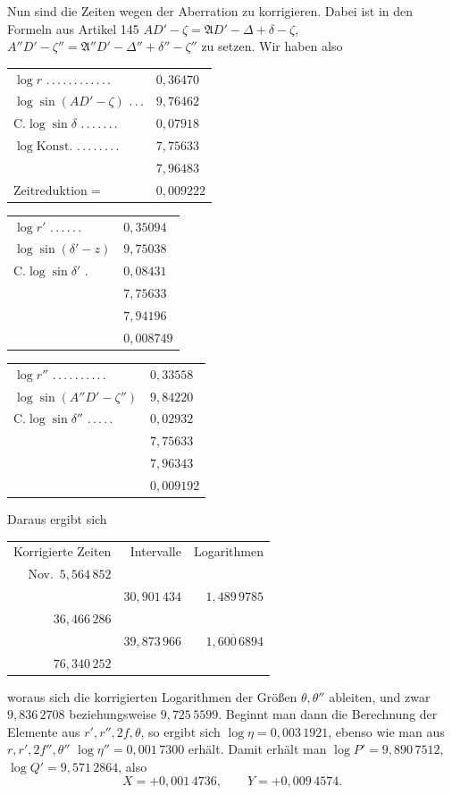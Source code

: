 Nun sind die Zeiten wegen der Aberration zu korrigieren. Dabei ist in den Formeln aus Artikel 145 $AD'-\zeta=\mathfrak AD'-\Delta+\delta-\zeta$, $A''D'-\zeta''=\mathfrak A''D'-\Delta''+\delta''-\zeta''$ zu setzen. Wir haben also
\begin{center}\begin{tabular}{ll}
$\log r$ .\,.\,.\,.\,.\,.\,.\,.\,.\,.\,.\,. & $0{,}36470$\\
$\log\sin(AD'-\zeta)$ .\,.\,. & $9{,}76462$\\
$\mathrm C.\log\sin\delta$ .\,.\,.\,.\,.\,.\,. & $0{,}07918$\\
$\log\mathrm{Konst.}$ .\,.\,.\,.\,.\,.\,.\,. & $7{,}75633$\\\hline
& $7{,}96483$\\
Zeitreduktion$=$ & $0{,}009222$
\end{tabular}\end{center}
\begin{center}\begin{tabular}{ll}
$\log r'$ .\,.\,.\,.\,.\,. & $0{,}35094$\\
$\log\sin(\delta'-z)$ & $9{,}75038$\\
$\mathrm C.\log\sin\delta'$ . & $0{,}08431$\\
& $7{,}75633$\\\hline
& $7{,}94196$\\
& $0{,}008749$
\end{tabular}\end{center}
\begin{center}\begin{tabular}{ll}
$\log r''$ .\,.\,.\,.\,.\,.\,.\,.\,.\,. & $0{,}33558$\\
$\log\sin(A''D'-\zeta'')$ & $9{,}84220$\\
$\mathrm C.\log\sin\delta''$ .\,.\,.\,.\,. & $0{,}02932$\\
& $7{,}75633$\\\hline
& $7{,}96343$\\
& $0{,}009192$
\end{tabular}\end{center}
\noindent Daraus ergibt sich
\begin{center}\begin{tabular}{r|r|r}
Korrigierte Zeiten & Intervalle & Logarithmen\\
Nov.\ $5{,}564\,852$ & &\\
& $30{,}901\,434$ & $1{,}489\,9785$\\
$36{,}466\,286$ & &\\
& $39{,}873\,966$ & $1{,}60\overset{.}{0}\,6894$\\
$76{,}340\,252$ & &
\end{tabular}\end{center}
\noindent woraus sich die korrigierten Logarithmen der Größen $\theta,\theta''$ ableiten, und zwar $9{,}836\,2708$ beziehungsweise $9{,}725\,5599$. Beginnt man dann die Berechnung der Elemente aus $r',r'',2f,\theta$, so ergibt sich $\log\eta=0{,}003\,1921$, ebenso wie man aus $r,r',2f'',\theta''$ $\log\eta''=0{,}001\,7300$ erhält. Damit erhält man $\log P'=9{,}890\,7512$, $\log Q'=9{,}571\,2864$, also
\[X=+0{,}001\,4736,\qquad Y=+0{,}009\,4574.\]

